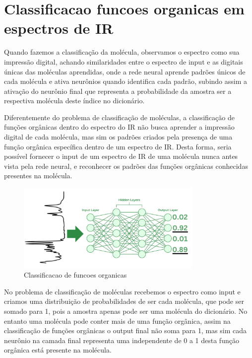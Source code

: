 \documentclass[11pt,a4paper]{article}
\begin{document}
\section{Classificacao funcoes organicas em espectros de IR}

Quando fazemos a classificação da molécula, observamos o espectro como sua impressão digital, achando similaridades entre o espectro de input e as digitais únicas das moléculas aprendidas, onde a rede neural aprende padrões únicos de cada molécula e ativa neurônios quando identifica cada padrão, subindo assim a ativação do neurônio final que representa a probabilidade da amostra ser a respectiva molécula deste índice no dicionário.

Diferentemente do problema de classificação de moléculas, a classificação de funções orgânicas dentro do espectro do IR não busca aprender a impressão digital de cada molécula, mas sim os padrões criados pela presença de uma função orgânica específica dentro de um espectro de IR. Desta forma, seria possível fornecer o input de um espectro de IR de uma molécula nunca antes vista pela rede neural, e reconhecer os padrões das funções orgânicas conhecidas presentes na molécula.

\begin{figure}[h]
    \centering
    \includegraphics[width=0.8\textwidth]{Images/N2.png}
    \caption{Classificacao de funcoes organicas}
    \label{fig:ir_spectrum}
\end{figure}


No problema de classificação  de moléculas recebemos o espectro como input e criamos uma distribuição de probabilidades de ser cada molécula, que pode ser somado para 1, pois a amostra apenas pode ser uma molécula do dicionário. No entanto uma molécula pode conter mais de uma função orgânica, assim na classificação de funções orgânicas  o output final não soma para 1, mas sim cada neurônio na camada final representa uma  independente de 0 a 1 desta função orgânica está presente na molécula. 
\end{document}
